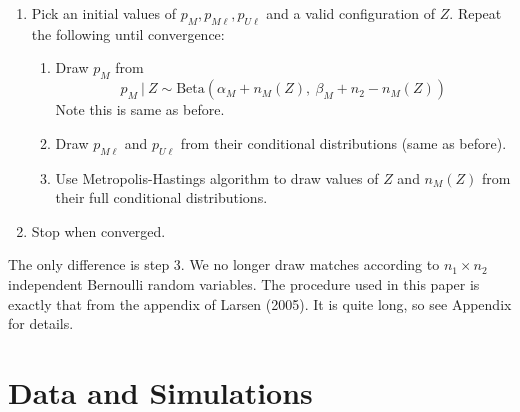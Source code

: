 \documentclass[11pt,reqno]{amsart}
\begin{document}
\begin{enumerate} 
\item Pick an initial values of $p_M, p_{M\ell}, p_{U\ell}$ and a valid configuration of $Z$.  Repeat the following until convergence:
\begin{enumerate} 
\item Draw $p_M$ from $$ p_M\ |\ Z \sim \text{Beta}(\alpha_M + n_{M}(Z),\ \beta_M + n_{2} - n_{M}(Z)) $$ Note this is same as before. 

\item  Draw $p_{M\ell}$ and $p_{U\ell}$ from their conditional distributions (same as before).

\item Use Metropolis-Hastings algorithm to draw values of $Z$ and $n_{M}(Z)$ from their full conditional distributions. 

\end{enumerate}

\item Stop when converged. 
\end{enumerate}
The only difference is step 3.  We no longer draw matches according to $n_1\times n_2$ independent Bernoulli random variables.  The procedure used in this paper is exactly that from the appendix of Larsen (2005).  It is quite long, so see Appendix for details. 


\section{Data and Simulations}
\end{document}
